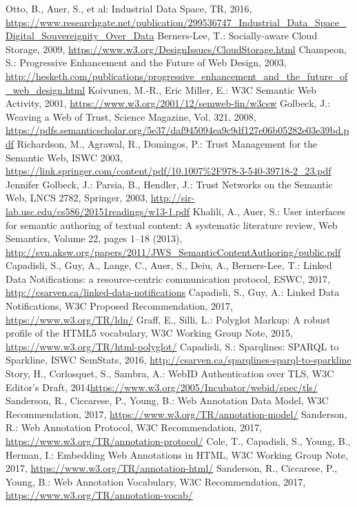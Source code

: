 \documentclass[a4paper]{llncs}
\begin{document}
\begin{thebibliography}{99}
   Otto, B., Auer, S., et al: Industrial Data Space, TR, 2016, \url{https://www.researchgate.net/publication/299536747\_Industrial\_Data\_Space\_Digital\_Souvereignity\_Over\_Data}
   Berners-Lee, T.: Socially-aware Cloud Storage, 2009, \url{https://www.w3.org/DesignIssues/CloudStorage.html}
   Champeon, S.: Progressive Enhancement and the Future of Web Design, 2003, \url{http://hesketh.com/publications/progressive\_enhancement\_and\_the\_future\_of\_web\_design.html}
   Koivunen, M.-R., Eric Miller, E.: W3C Semantic Web Activity, 2001, \url{https://www.w3.org/2001/12/semweb-fin/w3csw}
   Golbeck, J.: Weaving a Web of Trust, Science Magazine, Vol. 321, 2008, \url{https://pdfs.semanticscholar.org/5e37/daf945094ea9c9df127e06b05282e03e39bd.pdf}
   Richardson, M., Agrawal, R., Domingos, P.: Trust Management for the Semantic Web, ISWC 2003, \url{https://link.springer.com/content/pdf/10.1007\%2F978-3-540-39718-2\_23.pdf}
   Jennifer Golbeck, J.: Parsia, B., Hendler, J.: Trust Networks on the Semantic Web, LNCS 2782, Springer, 2003, \url{http://sir-lab.usc.edu/cs586/20151readings/w13-1.pdf}
   Khalili, A., Auer, S.: User interfaces for semantic authoring of textual content: A systematic literature review, Web Semantics, Volume 22, pages 1–18 (2013), \url{http://svn.aksw.org/papers/2011/JWS\_SemanticContentAuthoring/public.pdf}
   Capadisli, S., Guy, A., Lange, C., Auer, S., Deiu, A., Berners-Lee, T.: Linked Data Notifications: a resource-centric communication protocol, ESWC, 2017, \url{http://csarven.ca/linked-data-notifications}
   Capadisli, S., Guy, A.: Linked Data Notifications, W3C Proposed Recommendation, 2017, \url{https://www.w3.org/TR/ldn/}
   Graff, E., Silli, L.: Polyglot Markup: A robust profile of the HTML5 vocabulary, W3C Working Group Note, 2015, \url{https://www.w3.org/TR/html-polyglot/}
   Capadisli, S.: Sparqlines: SPARQL to Sparkline, ISWC SemStats, 2016, \url{http://csarven.ca/sparqlines-sparql-to-sparkline}
   Story, H., Corlosquet, S., Sambra, A.: WebID Authentication over TLS, W3C Editor’s Draft, 2014\url{https://www.w3.org/2005/Incubator/webid/spec/tls/}
   Sanderson, R., Ciccarese, P., Young, B.: Web Annotation Data Model, W3C Recommendation, 2017, \url{https://www.w3.org/TR/annotation-model/}
   Sanderson, R.: Web Annotation Protocol, W3C Recommendation, 2017, \url{https://www.w3.org/TR/annotation-protocol/}
   Cole, T., Capadisli, S., Young, B., Herman, I.: Embedding Web Annotations in HTML, W3C Working Group Note, 2017, \url{https://www.w3.org/TR/annotation-html/}
   Sanderson, R., Ciccarese, P., Young, B.: Web Annotation Vocabulary, W3C Recommendation, 2017, \url{https://www.w3.org/TR/annotation-vocab/}
\end{thebibliography}
\end{document}
